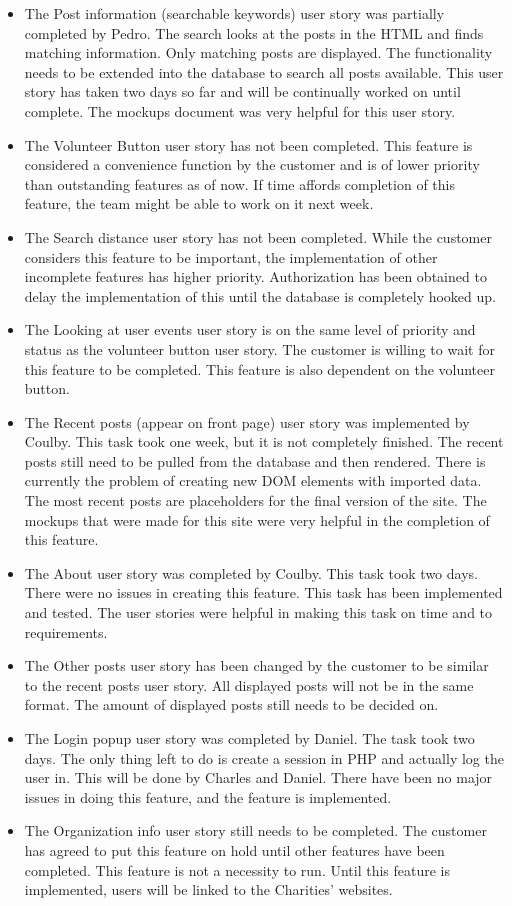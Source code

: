 \documentclass[12pt]{article}
\begin{document}
\begin{itemize}
\item
The Post information (searchable keywords) user story was partially completed
	by Pedro. The search looks at the posts in the HTML and finds matching
	information. Only matching posts are displayed. The functionality needs
	to be extended into the database to search all posts available. This
	user story has taken two days so far and will be continually worked
	on until complete. The mockups document was very helpful for this
	user story.
\item
	The Volunteer Button user story has not been completed. This feature is
	considered a convenience function by the customer and is of lower
	priority than outstanding features as of now. If time affords completion
	of this feature, the team might be able to work on it next week.
\item
	The Search distance user story has not been completed. While the customer
	considers this feature to be important, the implementation of
	other incomplete features has higher priority. Authorization has
	been obtained to delay the implementation of this until the database
	is completely hooked up.
\item
	The Looking at user events user story is on the same level of priority and status
	as the volunteer button user story. The customer is willing to wait for
	this feature to be completed. This feature is also dependent on the
	volunteer button.
\item
	The Recent posts (appear on front page) user story was implemented by
	Coulby. This task took one week, but it is not completely finished. The
	recent posts still need to be pulled from the database and then rendered.
	There is currently the problem of creating new DOM elements with imported data.
	The most recent posts are placeholders for the final version of the site. The
	mockups that were made for this site were very helpful in the completion of this
	feature.
\item
	The About user story was completed by Coulby. This task took two days. There
	were no issues in creating this feature. This task has been implemented and
	tested. The user stories were helpful in making this task on time and to
	requirements.
\item
	The Other posts user story has been changed by the customer to be similar to the
	recent posts user story. All displayed posts will not be in the same format.
	The amount of displayed posts still needs to be decided on.
\item
	The Login popup user story was completed by Daniel. The task took two days. The
	only thing left to do is create a session in PHP and actually log the user in.
	This will be done by Charles and Daniel. There have been no major issues in
	doing this feature, and the feature is implemented.
\item
	The Organization info user story still needs to be completed. The customer has
	agreed to put this feature on hold until other features have been completed.
	This feature is not a necessity to run. Until this feature is implemented, users
	will be linked to the Charities' websites.
\end{itemize}
\end{document}
